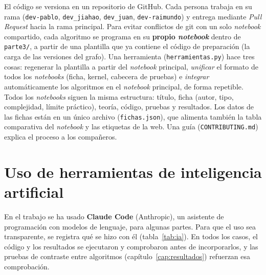 El código se versiona en un repositorio de GitHub. Cada persona trabaja en su rama (\texttt{dev-pablo}, \texttt{dev\_jiahao}, \texttt{dev\_juan}, \texttt{dev-raimundo}) y entrega mediante \emph{Pull Request} hacia la rama principal. Para evitar conflictos de git con un solo
\emph{notebook} compartido, cada algoritmo se programa en su \textbf{propio \emph{notebook}} dentro de \texttt{parte3/}, a partir de una plantilla que ya contiene el código de preparación (la carga de las versiones del grafo). Una herramienta (\texttt{herramientas.py}) hace tres cosas:
regenerar la plantilla a partir del \emph{notebook} principal, \emph{unificar} el formato de todos los \emph{notebooks} (ficha, kernel, cabecera de pruebas) e \emph{integrar} automáticamente los algoritmos en el \emph{notebook} principal, de forma repetible. Todos los \emph{notebooks} siguen la misma estructura:
título, ficha (autor, tipo, complejidad, límite práctico), teoría, código, pruebas y resultados. Los datos de las fichas están en un único archivo (\texttt{fichas.json}), que alimenta también la tabla comparativa del \emph{notebook} y las etiquetas de la web.
Una guía (\texttt{CONTRIBUTING.md}) explica el proceso a los compañeros.

\section{Uso de herramientas de inteligencia artificial}

En el trabajo se ha usado \textbf{Claude Code} (Anthropic), un asistente de programación con modelos de lenguaje, para algunas partes. Para que el uso sea transparente, se registra qué se hizo con él (tabla~\ref{tab:ia}). En todos los casos, el código y los resultados se ejecutaron y comprobaron antes de incorporarlos,
y las pruebas de contraste entre algoritmos (capítulo~\ref{cap:resultados}) refuerzan esa comprobación.

